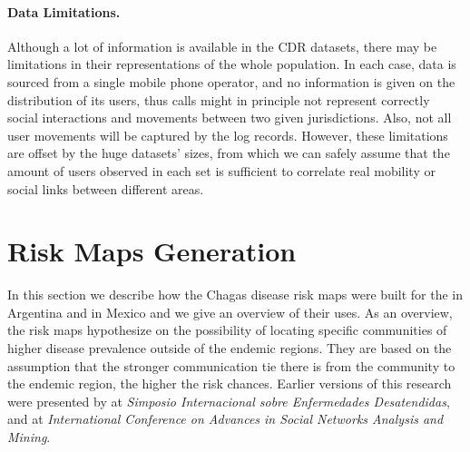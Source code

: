 

\paragraph{Data Limitations.}
Although a lot of information is available in the CDR datasets, there may be limitations in their representations of the whole population. In each case, data is sourced from a single mobile phone operator, and no information is given on the distribution of its users, thus calls might in principle not represent correctly social interactions and movements between two given jurisdictions. Also, not all user movements will be captured by the log records. However, these limitations are offset by the huge datasets' sizes, from which we can safely assume that the amount of users observed in each set is sufficient to correlate real mobility or social links between different areas.




\section{ Risk Maps Generation}\label{section:risk_maps}

In this section we describe how the Chagas disease risk maps were built for the in Argentina and in Mexico and we give an overview of their uses. As an overview, the risk maps hypothesize on the possibility of locating specific communities of higher disease prevalence outside of the endemic regions. They are based on the assumption that the stronger communication tie there is from the community to the endemic region, the higher the risk chances.
Earlier versions of this research were presented by \cite{sarraute2015descubriendo}
at \emph{Simposio Internacional sobre Enfermedades Desatendidas},
and \cite{deMonasterio2016analyzing} at \emph{International Conference on Advances in Social Networks Analysis and Mining}.

